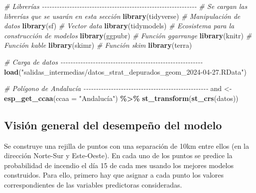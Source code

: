\documentclass[12pt,a4paper,]{book}
\newenvironment{Shaded}{\begin{snugshade}}{\end{snugshade}}
\newcommand{\AttributeTok}[1]{\textcolor[rgb]{0.13,0.29,0.53}{#1}}
\newcommand{\CommentTok}[1]{\textcolor[rgb]{0.56,0.35,0.01}{\textit{#1}}}
\newcommand{\FunctionTok}[1]{\textcolor[rgb]{0.13,0.29,0.53}{\textbf{#1}}}
\newcommand{\NormalTok}[1]{#1}
\newcommand{\OtherTok}[1]{\textcolor[rgb]{0.56,0.35,0.01}{#1}}
\newcommand{\SpecialCharTok}[1]{\textcolor[rgb]{0.81,0.36,0.00}{\textbf{#1}}}
\newcommand{\StringTok}[1]{\textcolor[rgb]{0.31,0.60,0.02}{#1}}
\numberwithin{dummy}{section}
\theoremstyle{ocrenumbox}
\theoremstyle{blacknumex}
\theoremstyle{blacknumbox}
\theoremstyle{ocrenum}
\theoremstyle{ocrenum}
\begin{document}
\begin{Shaded}
\begin{Highlighting}[]
\CommentTok{\# Librerías {-}{-}{-}{-}{-}{-}{-}{-}{-}{-}{-}{-}{-}{-}{-}{-}{-}{-}{-}{-}{-}{-}{-}{-}{-}{-}{-}{-}{-}{-}{-}{-}{-}{-}{-}{-}{-}{-}{-}{-}{-}{-}{-}{-}{-}{-}{-}{-}{-}{-}{-}{-}{-}{-}{-}{-}{-}{-}{-}{-}{-}{-}}
\CommentTok{\# Se cargan las librerías que se usarán en esta sección}
\FunctionTok{library}\NormalTok{(tidyverse) }\CommentTok{\# Manipulación de datos }
\FunctionTok{library}\NormalTok{(sf) }\CommentTok{\# Vector data}
\FunctionTok{library}\NormalTok{(tidymodels) }\CommentTok{\# Ecosistema para la construcción de modelos}
\FunctionTok{library}\NormalTok{(ggpubr) }\CommentTok{\# Función ggarrange}
\FunctionTok{library}\NormalTok{(knitr) }\CommentTok{\# Función kable}
\FunctionTok{library}\NormalTok{(skimr) }\CommentTok{\# Función skim}
\FunctionTok{library}\NormalTok{(terra)}

\CommentTok{\# Carga de datos {-}{-}{-}{-}{-}{-}{-}{-}{-}{-}{-}{-}{-}{-}{-}{-}{-}{-}{-}{-}{-}{-}{-}{-}{-}{-}{-}{-}{-}{-}{-}{-}{-}{-}{-}{-}{-}{-}{-}{-}{-}{-}{-}{-}{-}{-}{-}{-}{-}{-}{-}{-}{-}{-}{-}{-}{-}}
\FunctionTok{load}\NormalTok{(}\StringTok{"salidas\_intermedias/datos\_strat\_depurados\_geom\_2024{-}04{-}27.RData"}\NormalTok{) }

\CommentTok{\# Polígono de Andalucía {-}{-}{-}{-}{-}{-}{-}{-}{-}{-}{-}{-}{-}{-}{-}{-}{-}{-}{-}{-}{-}{-}{-}{-}{-}{-}{-}{-}{-}{-}{-}{-}{-}{-}{-}{-}{-}{-}{-}{-}{-}{-}{-}{-}{-}{-}{-}{-}{-}{-}}
\NormalTok{and }\OtherTok{\textless{}{-}} \FunctionTok{esp\_get\_ccaa}\NormalTok{(}\AttributeTok{ccaa =} \StringTok{"Andalucía"}\NormalTok{) }\SpecialCharTok{\%\textgreater{}\%} \FunctionTok{st\_transform}\NormalTok{(}\FunctionTok{st\_crs}\NormalTok{(datos))}
\end{Highlighting}
\end{Shaded}

\hypertarget{visiuxf3n-general-del-desempeuxf1o-del-modelo}{%
\subsection{Visión general del desempeño del
modelo}\label{visiuxf3n-general-del-desempeuxf1o-del-modelo}}

Se construye una rejilla de puntos con una separación de 10km entre
ellos (en la dirección Norte-Sur y Este-Oeste). En cada uno de los
puntos se predice la probabilidad de incendio el día 15 de cada mes
usando los mejores modelos construidos. Para ello, primero hay que
asignar a cada punto los valores correspondientes de las variables
predictoras consideradas.
\end{document}
